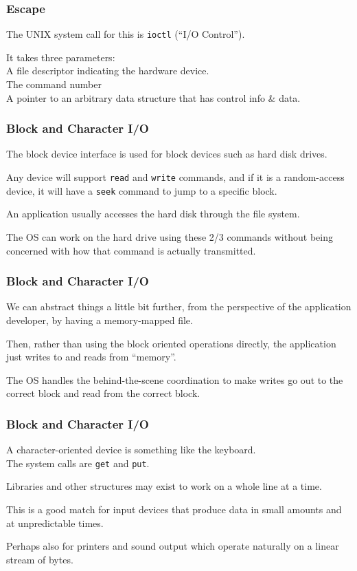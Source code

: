 \begin{frame}
\frametitle{Escape}


The UNIX system call for this is \texttt{ioctl} (``I/O Control''). 

It takes three parameters:\\
\quad A file descriptor indicating the hardware device.\\
\quad The command number\\
\quad A pointer to an arbitrary data structure that has control info \& data.

\end{frame}

\begin{frame}
\frametitle{Block and Character I/O}

The block device interface is used for block devices such as hard disk drives. 

Any device will support \texttt{read} and \texttt{write} commands, and if it is a random-access device, it will have a \texttt{seek} command to jump to a specific block. 

An application usually accesses the hard disk through the file system.

The OS can work on the hard drive using these 2/3 commands without being concerned with how that command is actually transmitted.

\end{frame}


\begin{frame}
\frametitle{Block and Character I/O}

We can abstract things a little bit further, from the perspective of the application developer, by having a memory-mapped file. 

Then, rather than using the block oriented operations directly, the application just writes to and reads from ``memory''.

The OS handles the behind-the-scene coordination to make writes go out to the correct block and read from the correct block.


\end{frame}

\begin{frame}
\frametitle{Block and Character I/O}

A character-oriented device is something like the keyboard.\\
\quad The system calls are \texttt{get} and \texttt{put}. 

Libraries and other structures may exist to work on a whole line at a time.

This is a good match for input devices that produce data in small amounts and at unpredictable times. 

Perhaps also for printers and sound output which operate naturally on a linear stream of bytes.

\end{frame}

